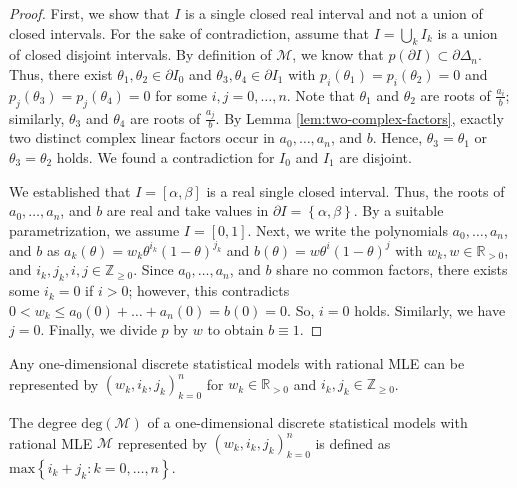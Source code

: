 \begin{proof}
    First, we show that \( I \) is a single closed real interval and not a union of closed intervals. For the sake of contradiction, assume that \( I = \bigcup_{k} I_k \) is a union of closed disjoint intervals. By definition of \( \mathcal{M} \), we know that \( p(\partial I) \subset \partial \Delta_n \). Thus, there exist \( \theta_1, \theta_2 \in \partial I_0 \) and \( \theta_3, \theta_4 \in \partial I_1 \) with \( p_i(\theta_1) = p_i(\theta_2) =  0 \) and \( p_j(\theta_3) = p_j(\theta_4) = 0 \) for some \( i,j = 0, \dots, n \). Note that \( \theta_1 \) and \( \theta_2 \) are roots of \( \frac{a_i}{b} \); similarly,  \( \theta_3 \) and \( \theta_4 \) are roots of \( \frac{a_j}{b} \). By Lemma \ref{lem:two-complex-factors}, exactly two distinct complex linear factors occur in \( a_0, \dots, a_n \), and \( b \). Hence, \( \theta_3 = \theta_1 \) or \( \theta_3 = \theta_2 \) holds. We found a contradiction for \( I_0 \) and \( I_1 \) are disjoint.

    We established that \( I = [\alpha, \beta ]\) is a real single closed interval. Thus, the roots of \( a_0, \dots, a_n\), and \( b \) are real and take values in \( \partial I = \left\{ \alpha, \beta \right\} \). By a suitable parametrization, we assume \( I = [0,1] \). Next, we write the polynomials \( a_0, \dots, a_n\), and \( b \) as \(  a_k(\theta) = w_k \theta^{i_k} (1-\theta)^{j_k} \) and \( b(\theta) = w \theta^{i} (1-\theta)^{j} \)
    with \( w_k, w \in \mathbb{R}_{>0} \), and \( i_k, j_k, i, j \in \mathbb{Z}_{\geq 0} \). Since \( a_0, \dots, a_n\), and \( b \) share no common factors, there exists some \( i_k = 0 \) if \( i > 0 \); however, this contradicts \(0 < w_k \leq a_0(0) + \dots + a_n(0) = b(0) = 0\). So, \( i = 0 \) holds. Similarly, we have \( j = 0 \). Finally, we divide \( p \) by \( w \) to obtain \( b \equiv 1 \).
\end{proof}

\begin{corollary}
    Any one-dimensional {discrete} {statistical} {models} with rational MLE can be represented by \( (w_k, i_k, j_k)_{k=0}^n \) for \( w_k \in \mathbb{R}_{>0} \) and \( i_k, j_k \in \mathbb{Z}_{\geq 0} \).
\end{corollary}

\begin{definition}
    The degree \( \mathrm{deg}(\mathcal{M}) \) of a one-dimensional discrete statistical models with rational MLE \( \mathcal{M} \) represented by \( (w_k, i_k, j_k)_{k=0}^n \) is defined as \( \mathrm{max}\left\{ i_k + j_k : k = 0, \dots, n \right\} \).
\end{definition}

